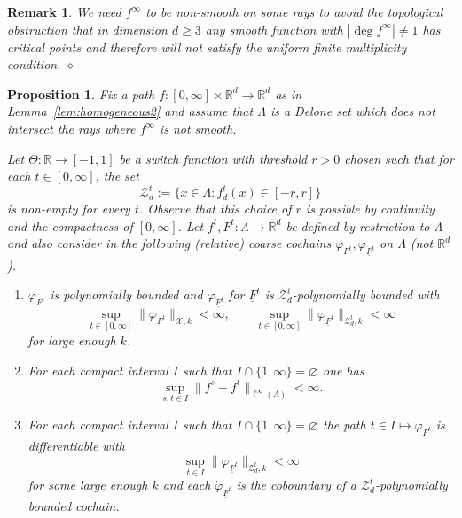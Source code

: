 \documentclass[12pt]{amsart}
\newtheorem{proposition}[theorem]{Proposition}
\newtheorem{remark}[theorem]{Remark}
\newcommand{\RM}{{\mathbb R}}
\newcommand{\Xx}{{\mathcal X}}
\newcommand{\Zz}{{\mathcal Z}}
\begin{document}
\begin{remark}
{\rm We need $f^{\infty}$ to be non-smooth on some rays to avoid the topological obstruction that in dimension $d\geq 3$ any smooth function with $|\deg f^{\infty}| \neq 1$ has critical points and therefore will not satisfy the uniform finite multiplicity condition. }$\diamond$
\end{remark}

\begin{proposition}\label{prop:polynomially_bounded_F}
Fix a path $f: [0,\infty] \times \RM^d \to \RM^d$ as in Lemma~\ref{lem:homogeneous2} and assume that $\Lambda$ is a Delone set which does not intersect the rays where $f^\infty$ is not smooth.

Let $\Theta:\RM \to [-1,1]$ be a switch function with threshold $r>0$ chosen such that for each $t \in [0,\infty]$, the set
$$\Zz^{t}_d := \{x\in \Lambda: f_d^{t}(x) \in [-r,r]\}$$
is non-empty for every $t$. Observe that this choice of $r$ is possible by continuity and the compactness of $[0,\infty]$. Let $f^t, F^t: \Lambda\to \RM^d$ be defined by restriction to $\Lambda$ and also consider in the following (relative) coarse cochains $\varphi_{F^{t}}, \varphi_{\underline{F}^{t}}$ on $\Lambda$ (not $\RM^d$). 
\begin{enumerate}
    \item[(i)] $\varphi_{F^{t}}$ is polynomially bounded and $\varphi_{\underline{F}^{t}}$ for $\underline{F}^{t}$ is $\Zz_d^{t}$-polynomially bounded with
    $$\sup_{t\in [0,\infty]} \|\varphi_{F^{t}}\|_{\Xx, k} <\infty, \qquad \sup_{t\in [0,\infty]} \|\varphi_{\underline{F}^{t}}\|_{\Zz^{t}_d, k} <\infty $$ 
    for large enough $k$.
    \item[(ii)] For each compact interval $I$ such that $I \cap \{1,\infty\}= \varnothing$ one has $$\sup_{s,t\in I}\|f^s-f^t\|_{\ell^\infty(\Lambda)} < \infty.$$ 
    \item[(iii)] For each compact interval $I$ such that $I\cap \{1,\infty\}= \varnothing$ the path $t\in I \mapsto \varphi_{\underline{F}^{t}}$ is differentiable with
    $$\sup_{t\in I} \|\dot{\varphi}_{\underline{F}^{t}}\|_{\Zz^{t}_d, k} <\infty $$ 
    for some large enough $k$ and each $\dot{\varphi}_{\underline{F}^t}$ is the coboundary of a $\Zz_d^t$-polynomially bounded cochain.
    \end{enumerate}   
\end{proposition}
\end{document}
